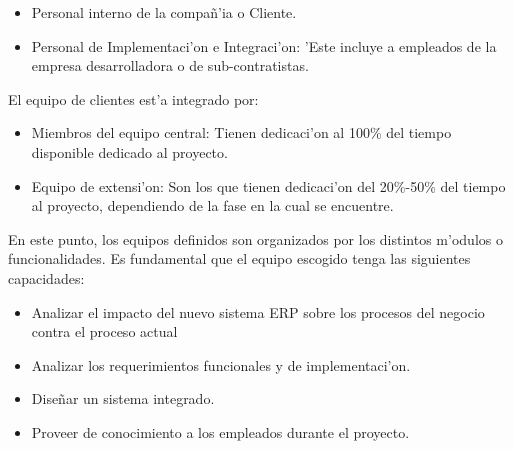 \begin{itemize}
\item Personal interno de la compa\~n'ia o Cliente.
\item Personal de Implementaci'on e Integraci'on: 'Este incluye a empleados de la empresa desarrolladora o de sub-contratistas.
\end{itemize}
El equipo de clientes est'a integrado por:
\begin{itemize}
\item Miembros del equipo central: Tienen dedicaci'on al 100\% del tiempo disponible dedicado al proyecto.
\item Equipo de extensi'on: Son los que tienen dedicaci'on del 20\%-50\% del tiempo al proyecto, dependiendo de la fase en la cual se encuentre.
\end{itemize}
\indent En este punto, los equipos definidos son organizados por los distintos m'odulos o funcionalidades.  
\newline
\newline
\indent Es fundamental que el equipo escogido tenga las siguientes capacidades:
\begin{itemize}
\item Analizar el impacto del nuevo sistema ERP sobre los procesos del negocio contra el proceso actual
\item Analizar los requerimientos funcionales y de implementaci'on. 
\item Dise\~nar un sistema integrado.
\item Proveer de conocimiento a los empleados durante el proyecto.
\end{itemize}
